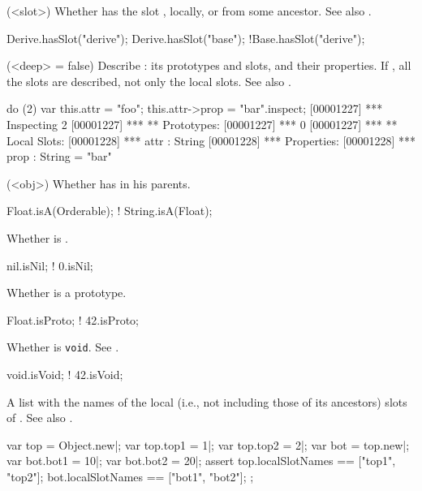 \begin{urbiscriptapi}
\item[hasSlot](<slot>)%
  Whether \this has the slot , locally, or from
  some ancestor.  See also .

\begin{urbiassert}
Derive.hasSlot("derive");
Derive.hasSlot("base");
!Base.hasSlot("derive");
\end{urbiassert}

\item['$id']%

\item[inspect](<deep> = false)%
  Describe \this: its prototypes and slots, and their
  properties.  If , all the slots are described, not only
  the local slots. See also .
\begin{urbiscript}
do (2) { var this.attr = "foo"; this.attr->prop = "bar"}.inspect;
[00001227] *** Inspecting 2
[00001227] *** ** Prototypes:
[00001227] ***   0
[00001227] *** ** Local Slots:
[00001228] ***   attr : String
[00001228] ***     Properties:
[00001228] ***      prop : String = "bar"
\end{urbiscript}

\item[isA](<obj>)%
  Whether \this has  in his parents.
\begin{urbiassert}
   Float.isA(Orderable);
! String.isA(Float);
\end{urbiassert}

\item[isNil]%
  Whether \this is .
\begin{urbiassert}
 nil.isNil;
!  0.isNil;
\end{urbiassert}

\item[isProto]
  Whether \this is a prototype.
\begin{urbiassert}
 Float.isProto;
!   42.isProto;
\end{urbiassert}

\item[isVoid]%
  Whether \this is \lstinline|void|.  See .
\begin{urbiassert}
void.isVoid;
! 42.isVoid;
\end{urbiassert}

\item[localSlotNames]%
  A list with the names of the local (i.e., not including those of its
  ancestors) slots of \this.  See also .
\begin{urbiscript}
var top = Object.new|;
var top.top1 = 1|;
var top.top2 = 2|;
var bot = top.new|;
var bot.bot1 = 10|;
var bot.bot2 = 20|;
assert
{
  top.localSlotNames == ["top1", "top2"];
  bot.localSlotNames == ["bot1", "bot2"];
};
\end{urbiscript}


\end{urbiscriptapi}
